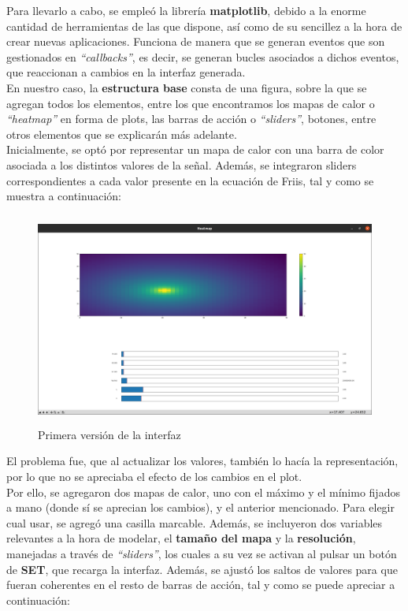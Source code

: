 Para llevarlo a cabo, se empleó la librería \textbf{matplotlib}, debido a la enorme cantidad de herramientas de las que dispone, así como de su sencillez a la hora de crear nuevas aplicaciones. Funciona de manera que se generan eventos que son gestionados en \emph{``callbacks''}, es decir, se generan bucles asociados a dichos eventos, que reaccionan a cambios en la interfaz generada.\\

En nuestro caso, la \textbf{estructura base} consta de una figura, sobre la que se agregan todos los elementos, entre los que encontramos los mapas de calor o \emph{``heatmap''} en forma de plots, las barras de acción o \emph{``sliders''}, botones, entre otros elementos que se explicarán más adelante.\\

Inicialmente, se optó por representar un mapa de calor con una barra de color asociada a los distintos valores de la señal. Además, se integraron sliders correspondientes a cada valor presente en la ecuación de Friis, tal y como se muestra a continuación:\\

\begin{figure} [H]
	\begin{center}
	\includegraphics[height=7cm]{imagenes/cap4/6_Friss_firstGUI.png}
	\end{center}
	\caption[Primera versión de la interfaz]{Primera versión de la interfaz}
	\label{fig:friis_init_app}
\end{figure}
\newpage
El problema fue, que al actualizar los valores, también lo hacía la representación, por lo que no se apreciaba el efecto de los cambios en el plot.\\

Por ello, se agregaron dos mapas de calor, uno con el máximo y el mínimo fijados a mano (donde sí se aprecian los cambios), y el anterior mencionado. Para elegir cual usar, se agregó una casilla marcable. Además, se incluyeron dos variables relevantes a la hora de modelar, el \textbf{tamaño del mapa} y la \textbf{resolución}, manejadas a través de \emph{``sliders''}, los cuales a su vez se activan al pulsar un botón de \textbf{SET}, que recarga la interfaz. Además, se ajustó los saltos de valores para que fueran coherentes en el resto de barras de acción, tal y como se puede apreciar a continuación:\\

